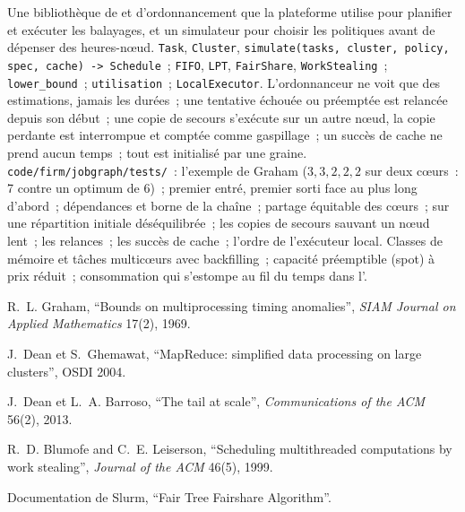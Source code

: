 \begin{build}
 Une bibliothèque de  et d'ordonnancement que la plateforme utilise pour planifier et exécuter les balayages, et un simulateur pour choisir les politiques
avant de dépenser des heures-nœud.
 \texttt{Task}, \texttt{Cluster}, \texttt{simulate(tasks, cluster, policy, spec, cache) -> Schedule}~;
\texttt{FIFO}, \texttt{LPT}, \texttt{FairShare}, \texttt{WorkStealing}~; \texttt{lower\_bound}~; \texttt{utilisation}~;
\texttt{LocalExecutor}.
 L'ordonnanceur ne voit que des estimations, jamais les durées~; une tentative échouée ou préemptée est relancée depuis son début~; une copie de secours s'exécute sur
un autre nœud, la copie perdante est interrompue et comptée comme gaspillage~; un succès de cache ne prend aucun temps~; tout est initialisé par une graine.
 \texttt{code/firm/jobgraph/tests/}~: l'exemple de Graham ($3,3,2,2,2$ sur deux cœurs~: 7 contre un optimum de 6)~; premier
entré, premier sorti face au plus long d'abord~; dépendances et borne de la chaîne~; partage équitable des cœurs~;  sur une répartition initiale déséquilibrée~;
les copies de secours sauvant un nœud lent~; les relances~; les succès de cache~; l'ordre de l'exécuteur local.
 Classes de mémoire et tâches multicœurs avec backfilling~; capacité préemptible (spot) à prix réduit~; consommation qui s'estompe au fil du temps
dans l'.
\end{build}

\begin{omsources}
\item R.~L. Graham, ``Bounds on multiprocessing timing anomalies'', \emph{SIAM Journal on Applied Mathematics} 17(2), 1969.
\item J.~Dean et S.~Ghemawat, ``MapReduce: simplified data processing on large clusters'', OSDI 2004.
\item J.~Dean et L.~A. Barroso, ``The tail at scale'', \emph{Communications of the ACM} 56(2), 2013.
\item R.~D. Blumofe and C.~E. Leiserson, ``Scheduling multithreaded computations by work stealing'', \emph{Journal of the ACM} 46(5), 1999.
\item Documentation de Slurm, ``Fair Tree Fairshare Algorithm''.
\end{omsources}

